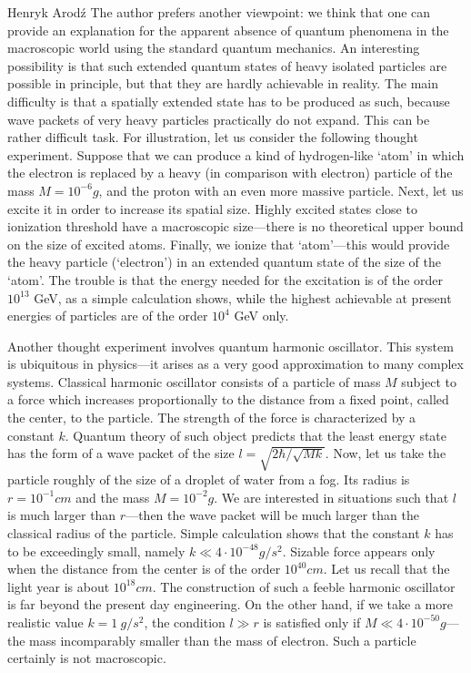 \begin{artengenv}{Henryk Arod\'z}
The author prefers another viewpoint: we think that one can provide an explanation for the apparent absence of quantum phenomena in the macroscopic world using the standard quantum mechanics. An interesting possibility is that such extended quantum states of heavy isolated particles are possible in principle, but that they are hardly achievable in reality. The main difficulty is that a spatially extended state has to be produced as such, because wave packets of very heavy particles practically do not expand. This can be rather difficult task. For illustration, let us consider the following thought experiment. Suppose that we can produce a kind of hydrogen-like `atom' in which the electron is replaced by a heavy (in comparison with electron) particle of the mass $M= 10^{-6} g$, and the proton with an even more massive particle. Next, let us excite it in order to increase its spatial size. Highly excited states close to ionization threshold have a macroscopic size---there is no theoretical upper bound on the size of excited atoms. Finally, we ionize that `atom'---this would provide the heavy particle (`electron') in an extended quantum state of the size of the `atom'. The trouble is that the energy needed for the excitation is of the order $10^{13}$ GeV, as a simple calculation shows, while the highest achievable at present energies of particles are of the order $10^{4}$ GeV only.

Another thought experiment involves quantum harmonic oscillator. This system is ubiquitous in physics---it arises as a very good approximation to many complex systems. Classical harmonic oscillator consists of a particle of mass $M$ subject to a force which increases proportionally to the distance from a fixed point, called the center, to the particle. The strength of the force is characterized by a constant $k$. Quantum theory of such object predicts that the least energy state has the form of a wave packet of the size $l = \sqrt{2 \hbar/ \sqrt{M k}}$. Now, let us take the particle roughly of the size of a droplet of water from a fog. Its radius is $r= 10^{-1} cm$ and the mass $M= 10^{-2} g$. We are interested in situations such that $l$ is much larger than $r$---then the wave packet will be much larger than the classical radius of the particle. Simple calculation shows that the constant $k$ has to be exceedingly small, namely $k \ll 4\cdot 10^{-48} g/s^2$. Sizable force appears only when the distance from the center is of the order $10^{40} cm$. Let us recall that the light year is about $10^{18} cm$. The construction of such a feeble harmonic oscillator is far beyond the present day engineering. On the other hand, if we take a more realistic value $k =1 \:g/s^2$, the condition $ l \gg r $ is satisfied only if $M \ll 4 \cdot 10^{-50} g$---the mass incomparably smaller than the mass of electron. Such a particle certainly is not macroscopic. 






\end{artengenv}
